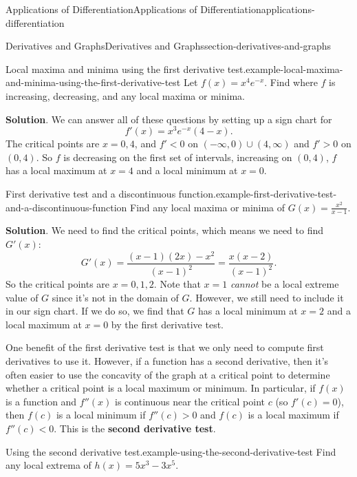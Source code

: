 \documentclass[oneside,10pt,]{book}
\newcommand{\terminology}[1]{\textbf{#1}}
\numberwithin{equation}{section}
\begin{document}
\begin{chapterptx}{Applications of Differentiation}{}{Applications of Differentiation}{}{}{applications-differentiation}
\begin{sectionptx}{Derivatives and Graphs}{}{Derivatives and Graphs}{}{}{section-derivatives-and-graphs}
\begin{example}{Local maxima and minima using the first derivative test.}{example-local-maxima-and-minima-using-the-first-derivative-test}
Let \(f(x) = x^{4}e^{-x}\). Find where \(f\) is increasing, decreasing, and any local maxima or minima.%
\par\smallskip%
\noindent\textbf{Solution}.\hypertarget{solution-75}{}\quad%
\hypertarget{p-348}{}%
We can answer all of these questions by setting up a sign chart for%
\begin{equation*}
f'(x) = x^{3}e^{-x}(4-x)\text{.}
\end{equation*}
The critical points are \(x=0,4\), and \(f' < 0\) on \((-\infty,0)\cup(4,\infty)\) and \(f' > 0\) on \((0,4)\). So \(f\) is decreasing on the first set of intervals, increasing on \((0,4)\), \(f\) has a local maximum at \(x=4\) and a local minimum at \(x=0\).%
\end{example}
\begin{example}{First derivative test and a discontinuous function.}{example-first-derivative-test-and-a-discontinuous-function}%
\hypertarget{p-349}{}%
Find any local maxima or minima of \(G(x) = \frac{x^{2}}{x-1}\).%
\par\smallskip%
\noindent\textbf{Solution}.\hypertarget{solution-76}{}\quad%
\hypertarget{p-350}{}%
We need to find the critical points, which means we need to find \(G'(x)\):%
\begin{equation*}
G'(x) = \frac{(x-1)(2x) - x^{2}}{(x-1)^{2}} = \frac{x(x-2)}{(x-1)^{2}}.
\end{equation*}
So the critical points are \(x=0,1,2\). Note that \(x=1\) \emph{cannot} be a local extreme value of \(G\) since it's not in the domain of \(G\). However, we still need to include it in our sign chart. If we do so, we find that \(G\) has a local minimum at \(x=2\) and a local maximum at \(x=0\) by the first derivative test.%
\end{example}
\hypertarget{p-351}{}%
One benefit of the first derivative test is that we only need to compute first derivatives to use it. However, if a function has a second derivative, then it's often easier to use the concavity of the graph at a critical point to determine whether a critical point is a local maximum or minimum. In particular, if \(f(x)\) is a function and \(f''(x)\) is continuous near the critical point \(c\) (so \(f'(c) = 0\)), then \(f(c)\) is a local minimum if \(f''(c) > 0\) and \(f(c)\) is a local maximum if \(f''(c) < 0\). This is the \terminology{second derivative test}.%
\begin{example}{Using the second derivative test.}{example-using-the-second-derivative-test}%
\hypertarget{p-352}{}%
Find any local extrema of \(h(x) = 5x^{3} - 3x^{5}\).%

\end{example}
\end{sectionptx}
\end{chapterptx}
\end{document}
